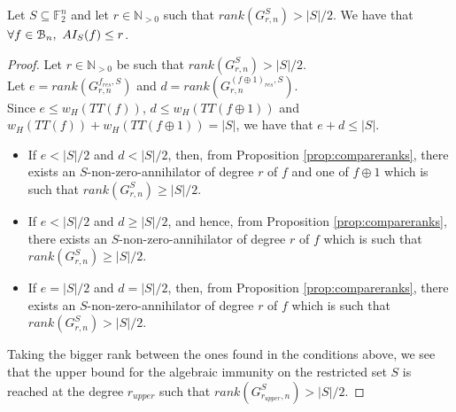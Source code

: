 \documentclass[11pt]{llncs}
\begin{document}
\begin{theorem}\label{upperBoundRestricted}
	Let $S\subseteq \mathbb{F}_2^n$ and let $r \in \mathbb{N}_{>0}$ such that $rank\left(G_{r, n}^{S}\right) > |S| / 2$.
	We have that $\forall f \in \mathcal{B}_{n}, \ AI_S(f) \leq r$.

\end{theorem}
\begin{proof}
	Let $r \in \mathbb{N}_{>0}$ be such that $rank\left(G_{r,n}^S\right) > |S| / 2$.\\
	Let $e = rank\left(G_{r,n}^{f_{res},S}\right)$ and $d = rank\left(G_{r,n}^{(f\oplus1)_{res},S}\right)$.\\
	Since $e \leq w_H\left(TT(f)\right)$, $d \leq w_H\left(TT(f\oplus 1)\right)$ and $w_H\left(TT(f)\right)+w_H\left(TT(f\oplus 1)\right) = |S|$, we have that $e+d\leq |S|$.\\
	\begin{itemize}
		\item If $e < |S|/2$ and $d < |S|/2$, then, from Proposition \ref{prop:compareranks}, there exists an $S$-non-zero-annihilator of degree $r$ of $f$ and one of $f\oplus 1$ which is such that $rank\left(G_{r,n}^S\right) \geq |S| / 2$.
		\item If $e < |S|/2$ and $d \geq |S|/2$, and hence, from Proposition \ref{prop:compareranks}, there exists an $S$-non-zero-annihilator of degree $r$ of $f$ which is such that $rank\left(G_{r,n}^S\right) \geq |S| / 2$.
		\item If $e = |S|/2$ and $d = |S|/2$, then, from Proposition \ref{prop:compareranks}, there exists an $S$-non-zero-annihilator of degree $r$ of $f$ which is such that $rank\left(G_{r,n}^S\right) > |S| / 2$.
	\end{itemize}
	Taking the bigger rank between the ones found in the conditions above, we see that the upper bound for the algebraic immunity on the restricted set $S$ is reached at the degree $r_{upper}$ such that $rank\left(G_{r_{upper}, n}^S\right) > |S| / 2$.
\end{proof}
\end{document}

